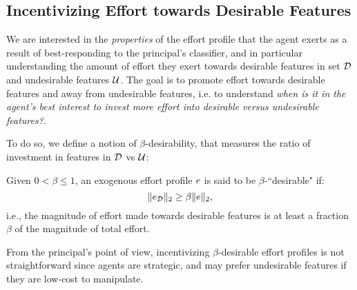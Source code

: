 \subsection{Incentivizing Effort towards Desirable Features} 

We are interested in the \emph{properties} of the effort profile that the agent exerts as a result of best-responding to the principal's classifier, and in particular understanding the amount of effort they exert towards desirable features in set $\mathcal{D}$ and undesirable features $\mathcal{U}$. The goal is to promote effort towards desirable features and away from undesirable features, i.e. to understand \textit{when is it in the agent's best interest to invest more effort into desirable versus undesirable features?}. 

To do so, we define a notion of $\beta$-desirability, that measures the ratio of investment in features in $\mathcal{D}$ vs $\mathcal{U}$: 

\begin{defn}\label{defn:good}
Given $0 < \beta \leq 1$, an exogenous effort profile $e$ is said to be $\beta$-``desirable" if: 
\[
    \|e_{\mathcal{D}}\|_2 \geq \beta \|e\|_2, 
\]
i.e., the magnitude of effort made towards desirable features is at least a fraction $\beta$ of the magnitude of total effort. 
\end{defn}

From the principal's point of view, incentivizing $\beta$-desirable effort profiles is not straightforward since agents are strategic, and may prefer undesirable features if they are low-cost to manipulate. 
